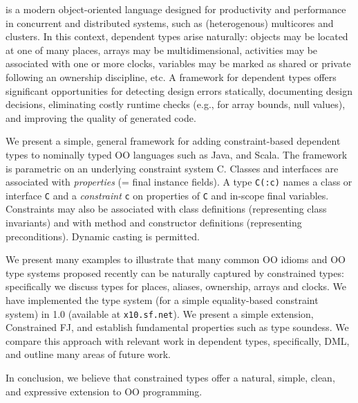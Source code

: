 \Xten{} is a modern object-oriented language designed for productivity
and performance in concurrent and distributed systems, such as
(heterogenous) multicores and clusters. In this context, dependent
types arise naturally: objects may be located at one of many places,
arrays may be multidimensional, activities may be associated with one
or more clocks, variables may be marked as shared or private following
an ownership discipline, etc.  A framework for dependent types offers
significant opportunities for detecting design errors statically,
documenting design decisions, eliminating costly runtime checks
(e.g., for array bounds, null values), and improving the quality of
generated code.

We present a simple, general framework for adding constraint-based
dependent types to nominally typed OO languages such as Java, \Xten{}
and Scala. The framework is parametric on an underlying constraint
system {\cal C}. Classes and interfaces are associated with {\em
properties} (= final instance fields). A type {\tt C(:c)} names a class
or interface {\tt C} and a {\em constraint} {\tt c} on
properties of {\tt C} and in-scope final variables.  Constraints
may also be associated with class definitions (representing
class invariants) and with method and constructor definitions
(representing preconditions). Dynamic casting is permitted.

We present many examples to illustrate that many common OO idioms and
OO type systems proposed recently can be naturally captured by
constrained types: specifically we discuss types for places, aliases,
ownership, arrays and clocks. We have implemented the type system (for
a simple equality-based constraint system) in \Xten{} 1.0 (available
at {\tt x10.sf.net}). We present a simple \FJ{} extension,
Constrained FJ, and establish fundamental properties such as type
soundess. We compare this approach with relevant work in dependent
types, specifically, DML, and outline many areas of future work.

In conclusion, we believe that constrained types offer a natural,
simple, clean, and expressive extension to OO programming.

